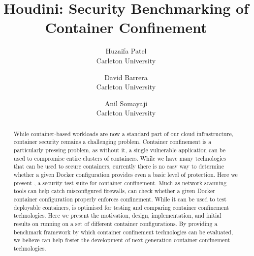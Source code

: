 \documentclass[letterpaper,twocolumn,10pt]{article}
\begin{document}


\title{\Large \bf Houdini: Security Benchmarking of Container Confinement}
\author{
{\rm Huzaifa Patel}\\
Carleton University
\and
{\rm David Barrera}\\
Carleton University
\and
{\rm Anil Somayaji}\\
Carleton University
} %

\maketitle

\begin{abstract}
  While container-based workloads are now a standard part of our cloud infrastructure, container security remains a challenging problem. Container confinement is a particularly pressing problem, as without it, a single vulnerable application can be used to compromise entire clusters of containers. While we have many technologies that can be used to secure containers, currently there is no easy way to determine whether a given Docker configuration provides even a basic level of protection. Here we present \houdini, a security test suite for container confinement. Much as network scanning tools can help catch misconfigured firewalls, \houdini can check whether a given Docker container configuration properly enforces confinement. While it can be used to test deployable containers, \houdini is optimised for testing and comparing container confinement technologies. Here we present the motivation, design, implementation, and initial results on running \houdini on a set of different container configurations. By providing a benchmark framework by which container confinement technologies can be evaluated, we believe \houdini can help foster the development of next-generation container confinement technologies.
\end{abstract}




% 


% 





\end{document}
